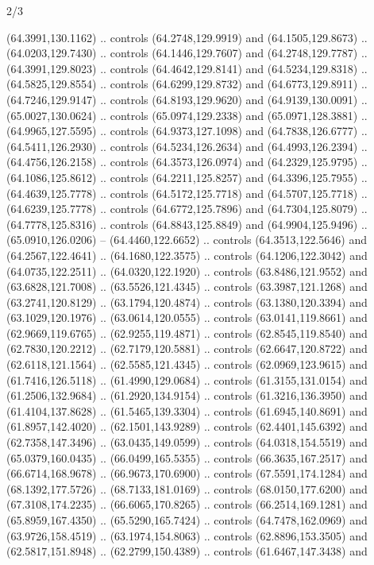 \begin{flagdescription}{2/3}
\begin{scope}[shift={(0.5\flaglength,0.5)},scale=\flagwidth/320]
\begin{scope}[y=0.8pt, x=0.8pt, yscale=-1,shift={(-118.3,-146)}]
  (64.3991,130.1162) .. controls (64.2748,129.9919) and (64.1505,129.8673) ..
  (64.0203,129.7430) .. controls (64.1446,129.7607) and (64.2748,129.7787) ..
  (64.3991,129.8023) .. controls (64.4642,129.8141) and (64.5234,129.8318) ..
  (64.5825,129.8554) .. controls (64.6299,129.8732) and (64.6773,129.8911) ..
  (64.7246,129.9147) .. controls (64.8193,129.9620) and (64.9139,130.0091) ..
  (65.0027,130.0624) .. controls (65.0974,129.2338) and (65.0971,128.3881) ..
  (64.9965,127.5595) .. controls (64.9373,127.1098) and (64.7838,126.6777) ..
  (64.5411,126.2930) .. controls (64.5234,126.2634) and (64.4993,126.2394) ..
  (64.4756,126.2158) .. controls (64.3573,126.0974) and (64.2329,125.9795) ..
  (64.1086,125.8612) .. controls (64.2211,125.8257) and (64.3396,125.7955) ..
  (64.4639,125.7778) .. controls (64.5172,125.7718) and (64.5707,125.7718) ..
  (64.6239,125.7778) .. controls (64.6772,125.7896) and (64.7304,125.8079) ..
  (64.7778,125.8316) .. controls (64.8843,125.8849) and (64.9904,125.9496) ..
  (65.0910,126.0206) -- (64.4460,122.6652) .. controls (64.3513,122.5646) and
  (64.2567,122.4641) .. (64.1680,122.3575) .. controls (64.1206,122.3042) and
  (64.0735,122.2511) .. (64.0320,122.1920) .. controls (63.8486,121.9552) and
  (63.6828,121.7008) .. (63.5526,121.4345) .. controls (63.3987,121.1268) and
  (63.2741,120.8129) .. (63.1794,120.4874) .. controls (63.1380,120.3394) and
  (63.1029,120.1976) .. (63.0614,120.0555) .. controls (63.0141,119.8661) and
  (62.9669,119.6765) .. (62.9255,119.4871) .. controls (62.8545,119.8540) and
  (62.7830,120.2212) .. (62.7179,120.5881) .. controls (62.6647,120.8722) and
  (62.6118,121.1564) .. (62.5585,121.4345) .. controls (62.0969,123.9615) and
  (61.7416,126.5118) .. (61.4990,129.0684) .. controls (61.3155,131.0154) and
  (61.2506,132.9684) .. (61.2920,134.9154) .. controls (61.3216,136.3950) and
  (61.4104,137.8628) .. (61.5465,139.3304) .. controls (61.6945,140.8691) and
  (61.8957,142.4020) .. (62.1501,143.9289) .. controls (62.4401,145.6392) and
  (62.7358,147.3496) .. (63.0435,149.0599) .. controls (64.0318,154.5519) and
  (65.0379,160.0435) .. (66.0499,165.5355) .. controls (66.3635,167.2517) and
  (66.6714,168.9678) .. (66.9673,170.6900) .. controls (67.5591,174.1284) and
  (68.1392,177.5726) .. (68.7133,181.0169) .. controls (68.0150,177.6200) and
  (67.3108,174.2235) .. (66.6065,170.8265) .. controls (66.2514,169.1281) and
  (65.8959,167.4350) .. (65.5290,165.7424) .. controls (64.7478,162.0969) and
  (63.9726,158.4519) .. (63.1974,154.8063) .. controls (62.8896,153.3505) and
  (62.5817,151.8948) .. (62.2799,150.4389) .. controls (61.6467,147.3438) and

\end{scope}
\end{scope}
\end{flagdescription}
